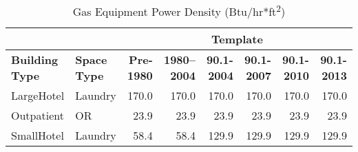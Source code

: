 \begin{table}
\small
\centering
\caption[Gas Equipment Power Density]{Gas Equipment Power Density (Btu/hr*ft\textsuperscript{2})}
\label{tab:gas_equip}
\begin{tabular}{|l|l|r|r|r|r|r|r|}
\hline
\multicolumn{2}{|c|}{} & \multicolumn{6}{c|}{{\textbf{Template}}} \\ \hline
\textbf{Building Type} & \textbf{Space Type} & \textbf{Pre-1980} & \textbf{1980--2004} & \textbf{90.1-2004} & \textbf{90.1-2007} & \textbf{90.1-2010} & \textbf{90.1-2013} \\ \hline
LargeHotel & Laundry  & 170.0 & 170.0 & 170.0 & 170.0 & 170.0 & 170.0 \\ \hline
Outpatient & OR      & 23.9 & 23.9 & 23.9 & 23.9 & 23.9 & 23.9 \\ \hline
SmallHotel & Laundry  & 58.4 & 58.4 & 129.9 & 129.9 & 129.9 & 129.9 \\ \hline
\end{tabular}
\end{table}